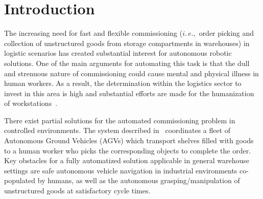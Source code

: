\section{Introduction}
\label{sec:intro}
%
The increasing need for fast and flexible commissioning ($i.\,e.,$ order picking and collection of
unstructured goods from storage compartments in warehouses) in logistic scenarios has created
substantial interest for autonomous robotic solutions. One of the main arguments for automating this
task is that the dull and strenuous nature of commissioning could cause mental and physical illness
in human workers. As a result, the determination within the logistics sector to invest in this area
is high and substantial efforts are made for the humanization of workstations~\cite{Eche08}.

There exist partial solutions for the automated commissioning problem in controlled
environments. The system described in~\cite{Wurm08} coordinates a fleet of Autonomous Ground
Vehicles (AGVs) which transport shelves filled with goods to a human worker who picks the
corresponding objects to complete the order. Key obstacles for a fully automatized solution
applicable in general warehouse settings are safe autonomous vehicle navigation in industrial
environments co-populated by humans, as well as the autonomous grasping/manipulation of unstructured
goods at satisfactory cycle times.
%
